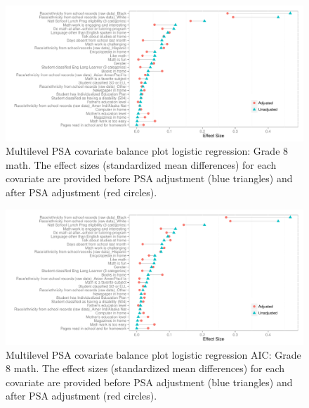 \begin{figure}[h!]
\begin{center}
\includegraphics[width=\textwidth]{../Figures2009/g8math-mlpsa-lr-balance.pdf}
\caption[Multilevel PSA covariate balance plot logistic regression: Grade 8 math]{Multilevel PSA covariate balance plot logistic regression: Grade 8 math. The effect sizes (standardized mean differences) for each covariate are provided before PSA adjustment (blue triangles) and after PSA adjustment (red circles).}
\end{center}
\end{figure}

\begin{figure}[h!]
\begin{center}
\includegraphics[width=\textwidth]{../Figures2009/g8math-mlpsa-lrAIC-balance.pdf}
\caption[Multilevel PSA covariate balance plot logistic regression AIC: Grade 8 math]{Multilevel PSA covariate balance plot logistic regression AIC: Grade 8 math. The effect sizes (standardized mean differences) for each covariate are provided before PSA adjustment (blue triangles) and after PSA adjustment (red circles).}
\end{center}
\end{figure}

